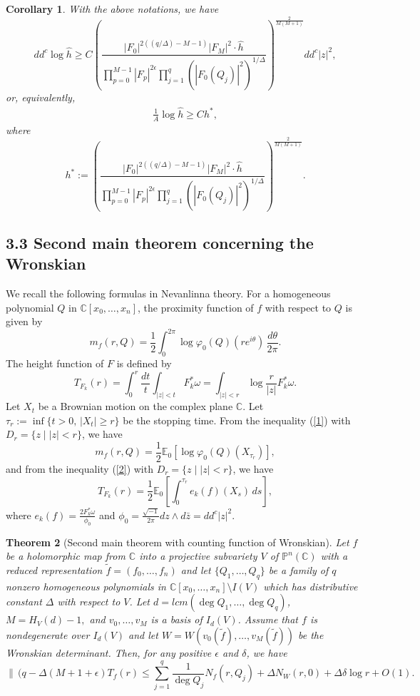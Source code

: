 \documentclass[12pt]{amsart}
\newtheorem{theorem}{Theorem}[section]
\newtheorem{corollary}[theorem]{Corollary}
\newcommand{\C}{{\mathbb{C}}}
\renewcommand{\P}{{\mathbb{P}}}
\newcommand{\bbC}{\mathbb{C}}
\newcommand{\bbE}{\mathbb{E}}
\begin{document}
\begin{corollary}\label{3.6}
With the above notations, we have
$$dd^c \log \hat{h} \geq C\left (\dfrac{|F_{0}|^{2((q/\Delta)-M-1)}|F_{M}|^2\cdot\hat{h}}{\prod_{p=0}^{M-1}|F_{p}|^{2\epsilon}\prod_{j=1}^q(|F_{0}(Q_j)|^2)^{1/\Delta}}\right)^{\frac{2}{M(M+1)}}dd^c|z|^2,$$
or, equivalently,
\begin{align}\label{3}
\frac{1}{A} \log \hat{h} \geq C h^*, 
\end{align}
where
$$h^* := \left (\dfrac{|F_{0}|^{2((q/\Delta)-M-1)}|F_{M}|^2\cdot\hat{h}}{\prod_{p=0}^{M-1}|F_{p}|^{2\epsilon}\prod_{j=1}^q(|F_{0}(Q_j)|^2)^{1/\Delta}}\right)^{\frac{2}{M(M+1)}}.$$
\end{corollary}

\subsection*{3.3 Second main theorem concerning the Wronskian}
We recall the following formulas in Nevanlinna theory. For a homogeneous polynomial $Q$ in $\C[x_0,\ldots,x_n]$, the proximity function of $f$ with respect to $Q$ is given by
$$m_f(r,Q)=\frac12 \int_{0}^{2\pi} \log \varphi_0(Q)(re^{i\theta})\, \frac{d\theta}{2\pi}.$$
The height function of $F$ is defined by
$$
T_{F_k}(r) = \int_{0}^{r}\frac{dt}{t} \int_{|z|<t}F_k^*\omega
=\int_{|z|<r}\log\frac{r}{|z|} F_k^*\omega.
$$
Let $X_t$ be a Brownian motion on the complex plane $\bbC$. Let $\tau_r := \inf\{t>0,\,|X_t| \geq r\}$ be the stopping time. From the inequality (\ref{1}) with $D_r = \{z \mid |z| < r\}$, we have
$$m_f(r,Q) = \frac{1}{2}\bbE_{0}[\log\varphi_{0}(Q)(X_{\tau_r})],$$
and from the inequality (\ref{2}) with $D_r = \{z \mid |z| < r\}$, we have
$$T_{F_k}(r) = \frac{1}{2}\bbE_{0} \left[ \int_{0}^{\tau_r} e_k(f)(X_s)\,ds \right],$$
where $e_k(f) = \frac{2 F_k^*\omega}{\phi_0}$ and $\phi_0 = \frac{\sqrt{-1}}{2\pi}dz\wedge d\bar{z}= dd^c |z|^2$.

\noindent
\begin{theorem}[Second main theorem with counting function of Wronskian]\label{3.7}
Let $f$ be a holomorphic map from $\C$ into a projective subvariety $V$ of $\P^n(\C)$ with a reduced representation $\tilde f=(f_0,\ldots,f_n)$ and let $\{Q_1,\ldots,Q_q\}$ be a family of $q$ nonzero homogeneous polynomials in $\C[x_0,\ldots,x_n]\setminus I(V)$ which has distributive constant $\Delta$ with respect to $V$. Let $d=lcm(\deg Q_1,\ldots,\deg Q_q)$, $M=H_V(d)-1,$ and $v_0,\ldots,v_M$ is a basis of $I_d(V)$. Assume that $f$ is nondegenerate over $I_d(V)$ and let  $W = W(v_0(\tilde f),\dots,v_M(\tilde f))$ be the Wronskian determinant. Then, for any positive $\epsilon$ and $\delta$, we have
$$\|\,(q-\Delta(M+1+\epsilon)T_f(r)\le\sum_{j=1}^q\frac{1}{\deg Q_j}N_f(r,Q_j)+\Delta N_W(r,0)+\Delta\delta \log r + O(1).$$
\end{theorem}
\end{document}
